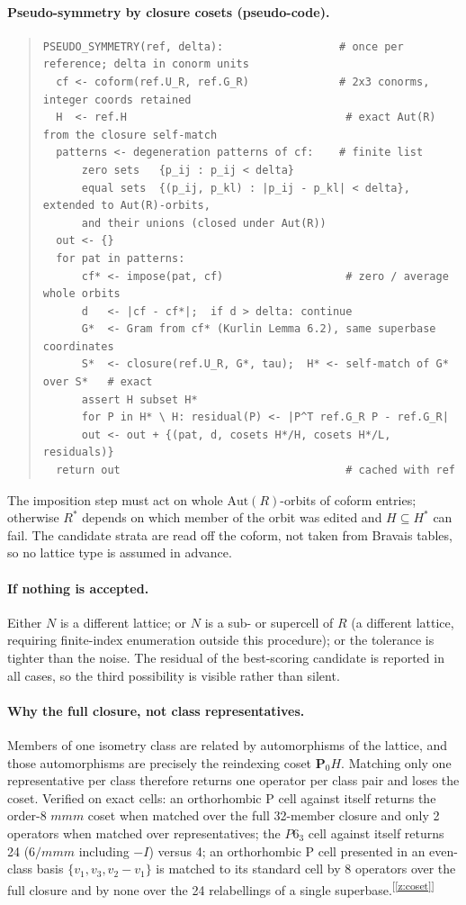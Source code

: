 \documentclass[11pt]{article}
\newcommand{\Pop}{\mathbf{P}}
\newcommand{\chk}[1]{\textsuperscript{[\ref{#1}]}}
\begin{document}
\paragraph{Pseudo-symmetry by closure cosets (pseudo-code).}
\begin{quote}\small\begin{verbatim}
PSEUDO_SYMMETRY(ref, delta):                  # once per reference; delta in conorm units
  cf <- coform(ref.U_R, ref.G_R)              # 2x3 conorms, integer coords retained
  H  <- ref.H                                  # exact Aut(R) from the closure self-match
  patterns <- degeneration patterns of cf:    # finite list
      zero sets   {p_ij : p_ij < delta}
      equal sets  {(p_ij, p_kl) : |p_ij - p_kl| < delta}, extended to Aut(R)-orbits,
      and their unions (closed under Aut(R))
  out <- {}
  for pat in patterns:
      cf* <- impose(pat, cf)                   # zero / average whole orbits
      d   <- |cf - cf*|;  if d > delta: continue
      G*  <- Gram from cf* (Kurlin Lemma 6.2), same superbase coordinates
      S*  <- closure(ref.U_R, G*, tau);  H* <- self-match of G* over S*   # exact
      assert H subset H*
      for P in H* \ H: residual(P) <- |P^T ref.G_R P - ref.G_R|
      out <- out + {(pat, d, cosets H*/H, cosets H*/L, residuals)}
  return out                                   # cached with ref
\end{verbatim}\end{quote}
The imposition step must act on whole $\mathrm{Aut}(R)$-orbits of coform entries; otherwise $R^*$ depends on which member of the orbit was edited and $H\subseteq H^*$ can fail. The candidate strata are read off the coform, not taken from Bravais tables, so no lattice type is assumed in advance.

\paragraph{If nothing is accepted.}
Either $N$ is a different lattice; or $N$ is a sub- or supercell of $R$ (a different lattice, requiring finite-index enumeration outside this procedure); or the tolerance is tighter than the noise. The residual of the best-scoring candidate is reported in all cases, so the third possibility is visible rather than silent.

\paragraph{Why the full closure, not class representatives.}
Members of one isometry class are related by automorphisms of the lattice, and those automorphisms are precisely the reindexing coset $\Pop_0H$. Matching only one representative per class therefore returns one operator per class pair and loses the coset. Verified on exact cells: an orthorhombic P cell against itself returns the order-8 $mmm$ coset when matched over the full 32-member closure and only 2 operators when matched over representatives; the $P6_3$ cell against itself returns 24 ($6/mmm$ including $-I$) versus 4; an orthorhombic P cell presented in an even-class basis $\{v_1,v_3,v_2-v_1\}$ is matched to its standard cell by 8 operators over the full closure and by none over the 24 relabellings of a single superbase.\chk{z:coset}
\end{document}
